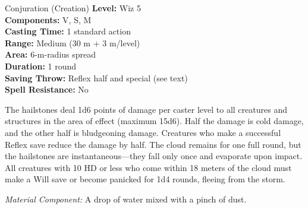 {Conjuration (Creation)}
{
	\textbf{Level:}
	Wiz 5\\
	\textbf{Components:}
	V, S, M\\
	\textbf{Casting Time:}
	1 standard action\\
	\textbf{Range:}
	Medium (30 m + 3 m/level)\\
	\textbf{Area:}
	6-m-radius spread\\
	\textbf{Duration:}
	1 round\\
	\textbf{Saving Throw:}
	Reflex half and special (see text)\\
	\textbf{Spell Resistance:}
	No\\
}
{
	The hailstones deal 1d6 points of damage per caster level to all creatures and structures in the area of effect (maximum 15d6). Half the damage is cold damage, and the other half is bludgeoning damage. Creatures who make a successful Reflex save reduce the damage by half. The cloud remains for one full round, but the hailstones are instantaneous---they fall only once and evaporate upon impact. All creatures with 10 HD or less who come within 18 meters of the cloud must make a Will save or become panicked for 1d4 rounds, fleeing from the storm.

	\textit{Material Component:} A drop of water mixed with a pinch of dust.
}
